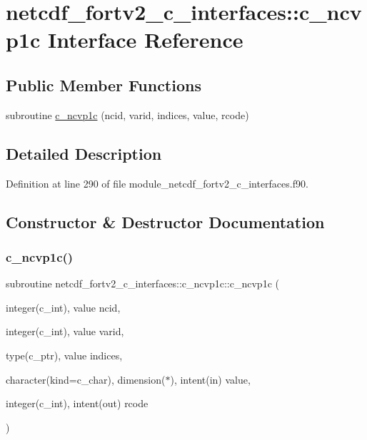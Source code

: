 \hypertarget{interfacenetcdf__fortv2__c__interfaces_1_1c__ncvp1c}{}\section{netcdf\+\_\+fortv2\+\_\+c\+\_\+interfaces\+:\+:c\+\_\+ncvp1c Interface Reference}
\label{interfacenetcdf__fortv2__c__interfaces_1_1c__ncvp1c}
\subsection*{Public Member Functions}
\begin{DoxyCompactItemize}
\item 
subroutine \hyperlink{interfacenetcdf__fortv2__c__interfaces_1_1c__ncvp1c_a537b9acb7cc36102befad0c0af63340c}{c\+\_\+ncvp1c} (ncid, varid, indices, value, rcode)
\end{DoxyCompactItemize}


\subsection{Detailed Description}


Definition at line 290 of file module\+\_\+netcdf\+\_\+fortv2\+\_\+c\+\_\+interfaces.\+f90.



\subsection{Constructor \& Destructor Documentation}
\mbox{\label{interfacenetcdf__fortv2__c__interfaces_1_1c__ncvp1c_a537b9acb7cc36102befad0c0af63340c}} 
\subsubsection{\texorpdfstring{c\+\_\+ncvp1c()}{c\_ncvp1c()}}
{\footnotesize\ttfamily subroutine netcdf\+\_\+fortv2\+\_\+c\+\_\+interfaces\+::c\+\_\+ncvp1c\+::c\+\_\+ncvp1c (\begin{DoxyParamCaption}\item[{integer(c\+\_\+int), value}]{ncid,  }\item[{integer(c\+\_\+int), value}]{varid,  }\item[{type(c\+\_\+ptr), value}]{indices,  }\item[{character(kind=c\+\_\+char), dimension($\ast$), intent(in)}]{value,  }\item[{integer(c\+\_\+int), intent(out)}]{rcode }\end{DoxyParamCaption})}




